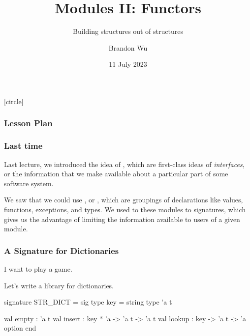 \documentclass[aspectratio=169]{beamer}
\title{Modules II: Functors} %
\subtitle{Building structures out of structures} %
\date{11 July 2023} %
\author{Brandon Wu} %
\newif\ifcolorlambda
\begin{document}
\ifweb
    \renewcommand{\pause}{}
\fi

[circle]

{
\begin{frame}[plain]
    \colorlambdatrue
    \titlepage
\end{frame}
}

\begin{frame}[fragile]
  \frametitle{Lesson Plan}

  \tableofcontents
\end{frame}


\begin{frame}[fragile]
  \frametitle{Last time}

  Last lecture, we introduced the idea of , which are first-class
  ideas of \textit{interfaces}, or the information that we make available about a
  particular part of some software system.

  \pause
  \vspace{\fill}

  We saw that we could use , or , which are groupings
  of declarations like values, functions, exceptions, and types. We used
   to  these modules to
  signatures, which gives us the advantage of limiting the information available to
  users of a given module.
\end{frame}


\begin{frame}[fragile]
  \frametitle{A Signature for Dictionaries}

  I want to play a game.

  \pause
  \vspace{\fill}

  Let's write a library for dictionaries.

  \pause
  \vspace{\fill}

  \begin{codeblock}
    signature STR_DICT =
      sig
        type key = string
        type 'a t

        val empty : 'a t
        val insert : key * 'a -> 'a t -> 'a t
        val lookup : key -> 'a t -> 'a option
      end
  \end{codeblock}
\end{frame}
\end{document}
